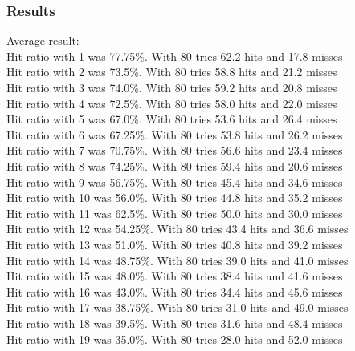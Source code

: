 \documentclass{article}
\begin{document}
 \subsubsection*{Results}
Average result:\\ 
Hit ratio with 1 was {\color{green}77.75\%}. With 80 tries 62.2 hits and 17.8 misses\\
Hit ratio with 2 was {\color{green}73.5\%}. With 80 tries 58.8 hits and 21.2 misses\\
Hit ratio with 3 was {\color{green}74.0\%}. With 80 tries 59.2 hits and 20.8 misses\\
Hit ratio with 4 was {\color{green}72.5\%}. With 80 tries 58.0 hits and 22.0 misses\\
Hit ratio with 5 was {\color{yellow}67.0\%}. With 80 tries 53.6 hits and 26.4 misses    \\
Hit ratio with 6 was {\color{yellow}67.25\%}. With 80 tries 53.8 hits and 26.2 misses   \\
Hit ratio with 7 was {\color{green}70.75\%}. With 80 tries 56.6 hits and 23.4 misses    \\
Hit ratio with 8 was {\color{green}74.25\%}. With 80 tries 59.4 hits and 20.6 misses  \\  
Hit ratio with 9 was {\color{red}56.75\%}. With 80 tries 45.4 hits and 34.6 misses  \\
Hit ratio with 10 was {\color{red}56.0\%}. With 80 tries 44.8 hits and 35.2 misses  \\
Hit ratio with 11 was {\color{yellow}62.5\%}. With 80 tries 50.0 hits and 30.0 misses   \\
Hit ratio with 12 was {\color{red}54.25\%}. With 80 tries 43.4 hits and 36.6 misses     \\
Hit ratio with 13 was {\color{red}51.0\%}. With 80 tries 40.8 hits and 39.2 misses    \\  
Hit ratio with 14 was {\color{red}48.75\%}. With 80 tries 39.0 hits and 41.0 misses \\
Hit ratio with 15 was {\color{red}48.0\%}. With 80 tries 38.4 hits and 41.6 misses  \\
Hit ratio with 16 was {\color{red}43.0\%}. With 80 tries 34.4 hits and 45.6 misses  \\
Hit ratio with 17 was {\color{red}38.75\%}. With 80 tries 31.0 hits and 49.0 misses \\
Hit ratio with 18 was {\color{red}39.5\%}. With 80 tries 31.6 hits and 48.4 misses  \\
Hit ratio with 19 was {\color{red}35.0\%}. With 80 tries 28.0 hits and 52.0 misses  \\
\end{document}
